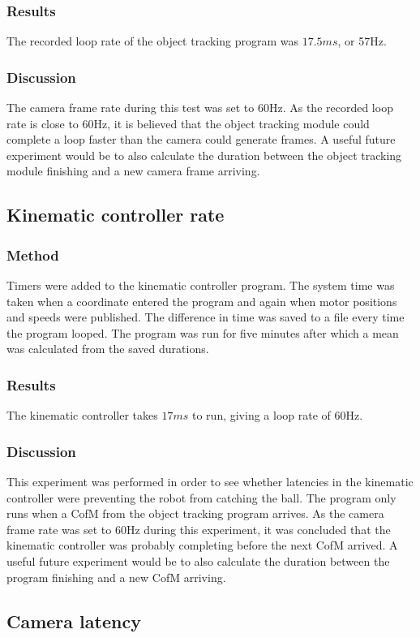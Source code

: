 \documentclass[conference]{IEEEtran}
\begin{document}
		\subsubsection{Results}
		The recorded loop rate of the object tracking program was $17.5ms$, or 57Hz.
		\subsubsection{Discussion}
		The camera frame rate during this test was set to 60Hz. As the recorded loop rate is close to 60Hz, it is believed that the object tracking module could complete a loop faster than the camera could generate frames. A useful future experiment would be to also calculate the duration between the object tracking module finishing and a new camera frame arriving.
		
	
	\subsection{Kinematic controller rate}
	\subsubsection{Method}
	Timers were added to the kinematic controller program. The system time was taken when a coordinate entered the program and again when motor positions and speeds were published. The difference in time was saved to a file every time the program looped. The program was run for five minutes after which a mean was calculated from the saved durations.
	\subsubsection{Results}
	The kinematic controller takes $17ms$ to run, giving a loop rate of 60Hz.
	\subsubsection{Discussion}
	This experiment was performed in order to see whether latencies in the kinematic controller were preventing the robot from catching the ball. The program only runs when a CofM from the object tracking program arrives. As the camera frame rate was set to 60Hz during this experiment, it was concluded that the kinematic controller was probably completing before the next CofM arrived. A useful future experiment would be to also calculate the duration between the program finishing and a new CofM arriving. 
	
		\subsection{Camera latency}
\end{document}
